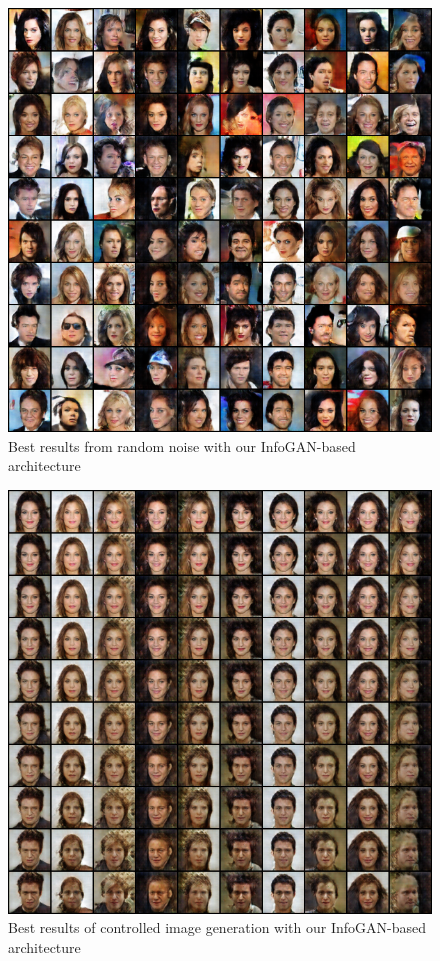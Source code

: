 \documentclass{egpubl}
\begin{document}
\begin{figure}[!htb]
	\centering
	\includegraphics[width=1\linewidth]{pic/best1}
	\caption{Best results from random noise with our InfoGAN-based architecture}
	\label{fig:best1}
\end{figure}



\begin{figure}[!htb]
	\centering
	\includegraphics[width=1\linewidth]{pic/best2}
	\caption{Best results of controlled image generation with our InfoGAN-based architecture}
	\label{fig:best2}
\end{figure}
\end{document}
